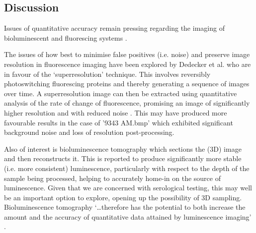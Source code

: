 \documentclass[a4paper]{article}
\begin{document}
\begin{multicols*}{2}
\section*{Discussion}

Issues of quantitative accuracy remain pressing regarding the imaging of bioluminescent and fluorescing systems \citep{taylor2015accounting}. 

The issues of how best to minimise false positives (i.e. noise) and preserve image resolution in fluorescence imaging have been explored by Dedecker et al. who are in favour of the ‘superresolution’ technique. This involves reversibly photoswitching fluorescing proteins and thereby generating a sequence of images over time. A superresolution image can then be extracted using quantitative analysis of the rate of change of fluorescence, promising an image of significantly higher resolution and with reduced noise \citep{dedecker2012widely}. This may have produced more favourable results in the case of '9343 AM.bmp' which exhibited significant background noise and loss of resolution post-processing.

Also of interest is bioluminescence tomography which sections the (3D) image and then reconstructs it. This is reported to produce significantly more stable (i.e. more consistent) luminescence, particularly with respect to the depth of the sample being processed, helping to accurately home-in on the source of luminescence. Given that we are concerned with serological testing, this may well be an important option to explore, opening up the possibility of 3D sampling. Bioluminescence tomography ‘…therefore has the potential to both increase the amount and the accuracy of quantitative data attained by luminescence imaging’ \citep{guggenheim2013bioluminescence}.




\end{multicols*}
\end{document}

